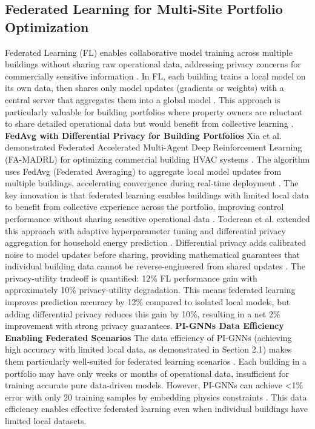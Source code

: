 \documentclass[12pt,a4paper]{article}
\begin{document}
\subsection{Federated Learning for Multi-Site Portfolio Optimization}
Federated Learning (FL) enables collaborative model training across multiple buildings without sharing raw operational data, addressing privacy concerns for commercially sensitive information \cite{ref153}. In FL, each building trains a local model on its own data, then shares only model updates (gradients or weights) with a central server that aggregates them into a global model \cite{ref153}. This approach is particularly valuable for building portfolios where property owners are reluctant to share detailed operational data but would benefit from collective learning \cite{ref58}.
\textbf{FedAvg with Differential Privacy for Building Portfolios}
Xia et al. demonstrated Federated Accelerated Multi-Agent Deep Reinforcement Learning (FA-MADRL) for optimizing commercial building HVAC systems \cite{ref153}. The algorithm uses FedAvg (Federated Averaging) to aggregate local model updates from multiple buildings, accelerating convergence during real-time deployment \cite{ref153}. The key innovation is that federated learning enables buildings with limited local data to benefit from collective experience across the portfolio, improving control performance without sharing sensitive operational data \cite{ref153}.
Toderean et al. extended this approach with adaptive hyperparameter tuning and differential privacy aggregation for household energy prediction \cite{ref58}. Differential privacy adds calibrated noise to model updates before sharing, providing mathematical guarantees that individual building data cannot be reverse-engineered from shared updates \cite{ref58}. The privacy-utility tradeoff is quantified: 12\% FL performance gain with approximately 10\% privacy-utility degradation. This means federated learning improves prediction accuracy by 12\% compared to isolated local models, but adding differential privacy reduces this gain by 10\%, resulting in a net 2\% improvement with strong privacy guarantees.
\textbf{PI-GNNs Data Efficiency Enabling Federated Scenarios}
The data efficiency of PI-GNNs (achieving high accuracy with limited local data, as demonstrated in Section 2.1) makes them particularly well-suited for federated learning scenarios \cite{ref162}. Each building in a portfolio may have only weeks or months of operational data, insufficient for training accurate pure data-driven models. However, PI-GNNs can achieve <1\% error with only 20 training samples by embedding physics constraints \cite{ref162}. This data efficiency enables effective federated learning even when individual buildings have limited local datasets.
\end{document}

